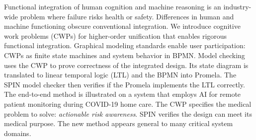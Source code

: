 Functional integration of human cognition and machine reasoning is an industry-wide problem where failure risks health or safety.
Differences in human and machine functioning obscure conventional integration. 
We introduce cognitive work problems (CWPs) for higher-order unification that enables rigorous functional integration. 
Graphical modeling standards enable user participation: CWPs as finite state machines and system behavior in BPMN. 
Model checking uses the CWP to prove correctness of the integrated design. 
Its state diagram is translated to linear temporal logic (LTL) and the BPMN into Promela. 
The SPIN model checker then verifies if the Promela implements the LTL correctly. 
The end-to-end method is illustrated on a system that employs AI for remote patient monitoring during COVID-19 home care. 
The CWP specifies the medical problem to solve: \emph{actionable risk awareness}.
SPIN verifies the design can meet its medical purpose. %
The new method appears general to many critical system domains.
